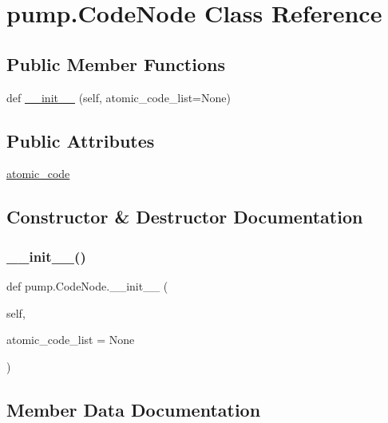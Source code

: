 \hypertarget{classpump_1_1CodeNode}{}\section{pump.\+Code\+Node Class Reference}
\label{classpump_1_1CodeNode}
\subsection*{Public Member Functions}
\begin{DoxyCompactItemize}
\item 
def \mbox{\hyperlink{classpump_1_1CodeNode_a2ca8a75324a64e48004812d6c0bc1cbd}{\+\_\+\+\_\+init\+\_\+\+\_\+}} (self, atomic\+\_\+code\+\_\+list=None)
\end{DoxyCompactItemize}
\subsection*{Public Attributes}
\begin{DoxyCompactItemize}
\item 
\mbox{\hyperlink{classpump_1_1CodeNode_ac7251110cc987c709e0e17d95521993e}{atomic\+\_\+code}}
\end{DoxyCompactItemize}


\subsection{Constructor \& Destructor Documentation}
\mbox{\label{classpump_1_1CodeNode_a2ca8a75324a64e48004812d6c0bc1cbd}} 
\subsubsection{\texorpdfstring{\_\_init\_\_()}{\_\_init\_\_()}}
{\footnotesize\ttfamily def pump.\+Code\+Node.\+\_\+\+\_\+init\+\_\+\+\_\+ (\begin{DoxyParamCaption}\item[{}]{self,  }\item[{}]{atomic\+\_\+code\+\_\+list = {\ttfamily None} }\end{DoxyParamCaption})}



\subsection{Member Data Documentation}
\mbox{\label{classpump_1_1CodeNode_ac7251110cc987c709e0e17d95521993e}} 
